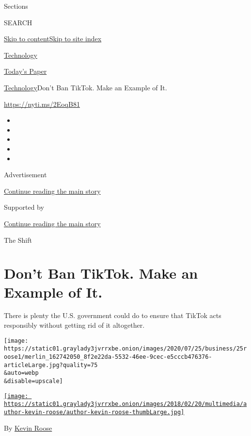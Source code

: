 Sections

SEARCH

\protect\hyperlink{site-content}{Skip to
content}\protect\hyperlink{site-index}{Skip to site index}

\href{https://www.nytimes3xbfgragh.onion/section/technology}{Technology}

\href{https://myaccount.nytimes3xbfgragh.onion/auth/login?response_type=cookie\&client_id=vi}{}

\href{https://www.nytimes3xbfgragh.onion/section/todayspaper}{Today's
Paper}

\href{/section/technology}{Technology}\textbar{}Don't Ban TikTok. Make
an Example of It.

\url{https://nyti.ms/2EoqB81}

\begin{itemize}
\item
\item
\item
\item
\item
\end{itemize}

Advertisement

\protect\hyperlink{after-top}{Continue reading the main story}

Supported by

\protect\hyperlink{after-sponsor}{Continue reading the main story}

The Shift

\hypertarget{dont-ban-tiktok-make-an-example-of-it}{%
\section{Don't Ban TikTok. Make an Example of
It.}\label{dont-ban-tiktok-make-an-example-of-it}}

There is plenty the U.S. government could do to ensure that TikTok acts
responsibly without getting rid of it altogether.

\texttt{[image: https://static01.graylady3jvrrxbe.onion/images/2020/07/25/business/25roose1/merlin\_162742050\_8f2e22da-5532-46ee-9cec-e5cccb476376-articleLarge.jpg?quality=75\\\&auto=webp\\\&disable=upscale]}

\href{https://www.nytimes3xbfgragh.onion/by/kevin-roose}{\texttt{[image: https://static01.graylady3jvrrxbe.onion/images/2018/02/20/multimedia/author-kevin-roose/author-kevin-roose-thumbLarge.jpg]}}

By \href{https://www.nytimes3xbfgragh.onion/by/kevin-roose}{Kevin Roose}

